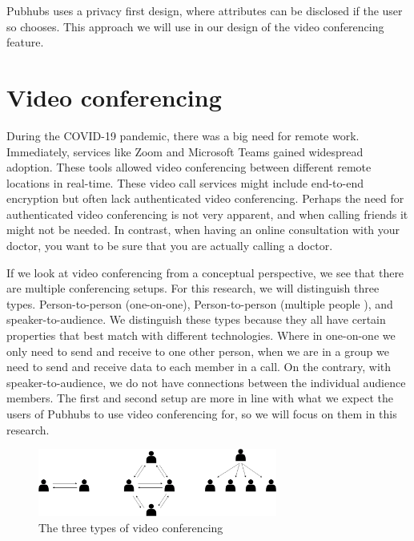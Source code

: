\documentclass{report}
\begin{document}
    Pubhubs uses a privacy first design, where attributes can be disclosed if the user so chooses. This approach we will
    use in our design of the video conferencing feature.


    \section{Video conferencing}
    During the COVID-19 pandemic, there was a big need for remote work. Immediately, services like Zoom \cite{Zoom}
    and Microsoft Teams  \cite{MSTeams}
    gained widespread adoption. These tools allowed video conferencing between different remote locations in real-time.
    These video call services might include end-to-end encryption but often lack authenticated video conferencing.
    Perhaps the need for authenticated video conferencing is not very apparent, and when calling friends it might not be
    needed. In contrast, when having an online consultation with your doctor, you want to be sure that you are actually
    calling a doctor.


    If we look at video conferencing from a conceptual perspective, we see that there are multiple conferencing setups.
    For this research, we will distinguish three types. Person-to-person (one-on-one), Person-to-person (multiple people
    ), and speaker-to-audience. We distinguish these types because they all have certain properties that best match with
    different technologies. Where in one-on-one we only need to send and receive to one other person, when we are in a
    group we need to send and receive data to each member in a call. On the contrary, with speaker-to-audience, we do
    not have connections between the individual audience members. The first and second setup are more in line with what
    we expect the users of Pubhubs to use video conferencing for, so we will focus on them in this research.

    \begin{figure}[!hbt]
        \centering
        \includegraphics[width=0.7\textwidth]{img/three-types}
        \caption{The three types of video conferencing}
        \label{fig:enter-label}
    \end{figure}
\end{document}
